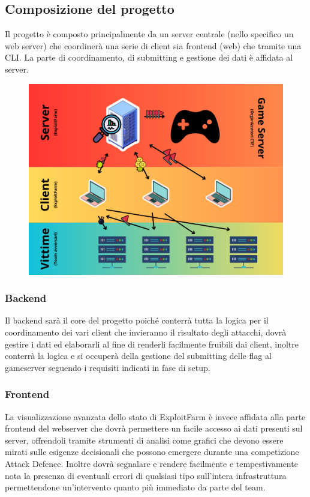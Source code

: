\documentclass[11pt]{article}
\begin{document}
\subsection{Composizione del progetto}
Il progetto è composto principalmente da un server centrale (nello specifico un web server) che coordinerà una serie di client sia frontend (web) che tramite una CLI. La parte di coordinamento, di submitting e gestione dei dati è affidata al server.
    \begin{figure}[h]
    	\centering
    	\includegraphics[width=1\textwidth]{general_layout.png}
	\end{figure}
\subsubsection{Backend}
Il backend sarà il core del progetto poiché conterrà tutta la logica per il coordinamento dei vari client che invieranno il risultato degli attacchi, dovrà gestire i dati ed elaborarli al fine di renderli facilmente fruibili dai client, inoltre conterrà la logica e si occuperà della gestione del submitting delle flag al gameserver seguendo i requisiti indicati in fase di setup.
\subsubsection{Frontend}
La visualizzazione avanzata dello stato di ExploitFarm è invece affidata alla parte frontend del webserver che dovrà permettere un facile accesso ai dati presenti sul server, offrendoli tramite strumenti di analisi come grafici che devono essere mirati sulle esigenze decisionali che possono emergere durante una competizione Attack Defence. Inoltre dovrà segnalare e rendere facilmente e tempestivamente nota la presenza di eventuali errori di qualsiasi tipo sull'intera infrastruttura permettendone un'intervento quanto più immediato da parte del team.
\end{document}
